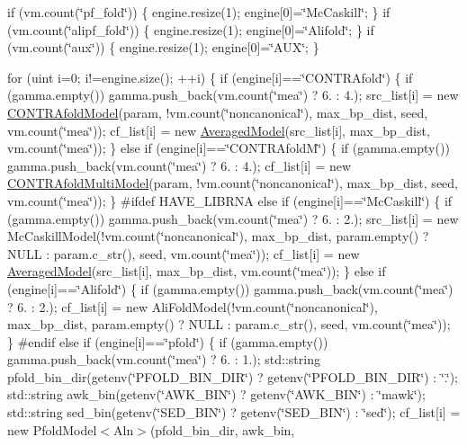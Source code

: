 if (vm.\+count(\char`\"{}pf\+\_\+fold\char`\"{})) \{ engine.\+resize(1); engine\mbox{[}0\mbox{]}=\char`\"{}\+Mc\+Caskill\char`\"{}; \} if (vm.\+count(\char`\"{}alipf\+\_\+fold\char`\"{})) \{ engine.\+resize(1); engine\mbox{[}0\mbox{]}=\char`\"{}\+Alifold\char`\"{}; \} if (vm.\+count(\char`\"{}aux\char`\"{})) \{ engine.\+resize(1); engine\mbox{[}0\mbox{]}=\char`\"{}\+A\+U\+X\char`\"{}; \}

for (uint i=0; i!=engine.\+size(); ++i) \{ if (engine\mbox{[}i\mbox{]}==\char`\"{}\+C\+O\+N\+T\+R\+Afold\char`\"{}) \{ if (gamma.\+empty()) gamma.\+push\+\_\+back(vm.\+count(\char`\"{}mea\char`\"{}) ? 6. \+: 4.); src\+\_\+list\mbox{[}i\mbox{]} = new \hyperlink{class_c_o_n_t_r_afold_model}{C\+O\+N\+T\+R\+Afold\+Model}(param, !vm.count(\char`\"{}noncanonical\char`\"{}), max\+\_\+bp\+\_\+dist, seed, vm.\+count(\char`\"{}mea\char`\"{})); cf\+\_\+list\mbox{[}i\mbox{]} = new \hyperlink{class_averaged_model}{Averaged\+Model}(src\+\_\+list\mbox{[}i\mbox{]}, max\+\_\+bp\+\_\+dist, vm.\+count(\char`\"{}mea\char`\"{})); \} else if (engine\mbox{[}i\mbox{]}==\char`\"{}\+C\+O\+N\+T\+R\+Afold\+M\char`\"{}) \{ if (gamma.\+empty()) gamma.\+push\+\_\+back(vm.\+count(\char`\"{}mea\char`\"{}) ? 6. \+: 4.); cf\+\_\+list\mbox{[}i\mbox{]} = new \hyperlink{class_c_o_n_t_r_afold_multi_model}{C\+O\+N\+T\+R\+Afold\+Multi\+Model}(param, !vm.count(\char`\"{}noncanonical\char`\"{}), max\+\_\+bp\+\_\+dist, seed, vm.\+count(\char`\"{}mea\char`\"{})); \} \#ifdef H\+A\+V\+E\+\_\+\+L\+I\+B\+R\+N\+A else if (engine\mbox{[}i\mbox{]}==\char`\"{}\+Mc\+Caskill\char`\"{}) \{ if (gamma.\+empty()) gamma.\+push\+\_\+back(vm.\+count(\char`\"{}mea\char`\"{}) ? 6. \+: 2.); src\+\_\+list\mbox{[}i\mbox{]} = new Mc\+Caskill\+Model(!vm.count(\char`\"{}noncanonical\char`\"{}), max\+\_\+bp\+\_\+dist, param.\+empty() ? N\+U\+L\+L \+: param.\+c\+\_\+str(), seed, vm.\+count(\char`\"{}mea\char`\"{})); cf\+\_\+list\mbox{[}i\mbox{]} = new \hyperlink{class_averaged_model}{Averaged\+Model}(src\+\_\+list\mbox{[}i\mbox{]}, max\+\_\+bp\+\_\+dist, vm.\+count(\char`\"{}mea\char`\"{})); \} else if (engine\mbox{[}i\mbox{]}==\char`\"{}\+Alifold\char`\"{}) \{ if (gamma.\+empty()) gamma.\+push\+\_\+back(vm.\+count(\char`\"{}mea\char`\"{}) ? 6. \+: 2.); cf\+\_\+list\mbox{[}i\mbox{]} = new Ali\+Fold\+Model(!vm.count(\char`\"{}noncanonical\char`\"{}), max\+\_\+bp\+\_\+dist, param.\+empty() ? N\+U\+L\+L \+: param.\+c\+\_\+str(), seed, vm.\+count(\char`\"{}mea\char`\"{})); \} \#endif else if (engine\mbox{[}i\mbox{]}==\char`\"{}pfold\char`\"{}) \{ if (gamma.\+empty()) gamma.\+push\+\_\+back(vm.\+count(\char`\"{}mea\char`\"{}) ? 6. \+: 1.); std\+::string pfold\+\_\+bin\+\_\+dir(getenv(\char`\"{}\+P\+F\+O\+L\+D\+\_\+\+B\+I\+N\+\_\+\+D\+I\+R\char`\"{}) ? getenv(\char`\"{}\+P\+F\+O\+L\+D\+\_\+\+B\+I\+N\+\_\+\+D\+I\+R\char`\"{}) \+: \char`\"{}.\char`\"{}); std\+::string awk\+\_\+bin(getenv(\char`\"{}\+A\+W\+K\+\_\+\+B\+I\+N\char`\"{}) ? getenv(\char`\"{}\+A\+W\+K\+\_\+\+B\+I\+N\char`\"{}) \+: \char`\"{}mawk\char`\"{}); std\+::string sed\+\_\+bin(getenv(\char`\"{}\+S\+E\+D\+\_\+\+B\+I\+N\char`\"{}) ? getenv(\char`\"{}\+S\+E\+D\+\_\+\+B\+I\+N\char`\"{}) \+: \char`\"{}sed\char`\"{}); cf\+\_\+list\mbox{[}i\mbox{]} = new Pfold\+Model$<$\+Aln$>$(pfold\+\_\+bin\+\_\+dir, awk\+\_\+bin, 